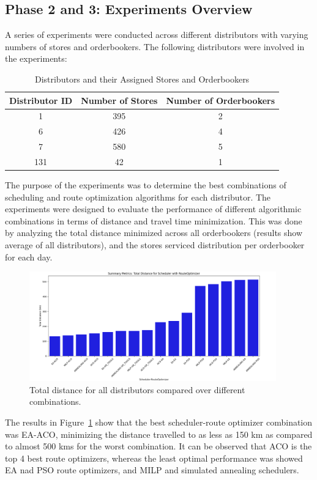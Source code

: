 \subsection{Phase 2 and 3: Experiments Overview}
A series of experiments were conducted across different distributors with varying numbers of stores and orderbookers. The following distributors were involved in the experiments:
\begin{table}[h!]
\centering
\begin{tabular}{|c|c|c|}
\hline
\textbf{Distributor ID} & \textbf{Number of Stores} & \textbf{Number of Orderbookers} \\
\hline
1 & 395 & 2 \\
6 & 426 & 4 \\
7 & 580 & 5 \\
131 & 42 & 1 \\
\hline
\end{tabular}
\caption{Distributors and their Assigned Stores and Orderbookers}
\end{table}

The purpose of the experiments was to determine the best combinations of scheduling and route optimization algorithms for each distributor. The experiments were designed to evaluate the performance of different algorithmic combinations in terms of distance and travel time minimization.
This was done by analyzing the total distance minimized across all orderbookers (results show average of all distributors), and the stores serviced distribution per orderbooker for each day.

\begin{figure}[H]
    \centering
    \includegraphics[width=0.95\textwidth]{images/results_distance_all_dis}
    \caption{Total distance for all distributors compared over different combinations.}
    \label{fig:results_distance_all_dis}
\end{figure}

The results in Figure~\ref{fig:results_distance_all_dis} show that the best scheduler-route optimizer combination was EA-ACO, minimizing the distance travelled to as less as 150 km as compared to almost 500 kms for the worst combination. 
It can be observed that ACO is the top 4 best route optimizers, whereas the least optimal performance was showed EA nad PSO route optimizers, and MILP and simulated annealing schedulers.


